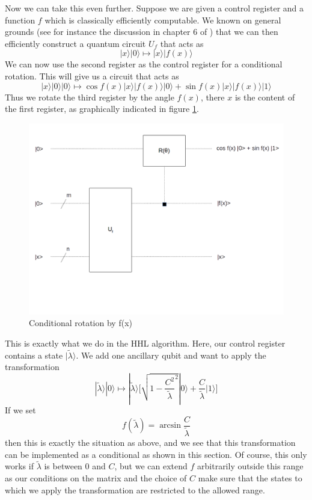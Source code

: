 \documentclass[a4paper, draft]{article}
\theoremstyle{own}
\theoremstyle{remark}
\begin{document}
Now we can take this even further. Suppose we are given a control register and a function $f$ which is classically efficiently computable. We known on general grounds (see for instance the discussion in chapter 6 of  \cite{RieffelPolak}) that we can then efficiently construct a quantum circuit $U_f$ that acts as
$$
|x \rangle |0 \rangle \mapsto |x \rangle |f(x) \rangle 
$$
We can now use the second register as the control register for a conditional rotation. This will give us a circuit that acts as
$$
|x \rangle |0 \rangle |0 \rangle \mapsto \cos f(x) |x \rangle |f(x) \rangle 
|0 \rangle + \sin f(x) |x \rangle |f(x) \rangle |1 \rangle 
$$
Thus we rotate the third register by the angle $f(x)$, there $x$ is the content of the first register, as graphically indicated in figure \ref{fig:GeneralizedConditionalRotation}.

\begin{figure}[ht]
\centering
\includegraphics[width=0.7\linewidth]{images/GeneralizedConditionalRotation}
\caption[Conditional rotation by f(x)]{Conditional rotation by f(x)}
\label{fig:GeneralizedConditionalRotation}
\end{figure}

This is exactly what we do in the HHL algorithm. Here, our control register contains a state $|\tilde{\lambda}\rangle$. We add one ancillary qubit and want to apply the transformation
$$
|\tilde{\lambda} \rangle |0 \rangle \mapsto 
|\tilde{\lambda} \rangle 
\big[  
\sqrt{1-\frac{C^2}{\tilde{\lambda}}^2} |0 \rangle 
+
\frac{C}{\tilde{\lambda}} |1 \rangle
\big]
$$
If we set 
$$
f(\tilde{\lambda}) = \arcsin \frac{C}{\tilde{\lambda}}
$$
then this is exactly the situation as above, and we see that this transformation can be implemented as a conditional as shown in this section. Of course, this only works if $\tilde{\lambda}$ is between $0$ and $C$, but we can extend $f$ arbitrarily outside this range as our conditions on the matrix and the choice of $C$ make sure that the states to which we apply the transformation are restricted to the allowed range.
\end{document}
